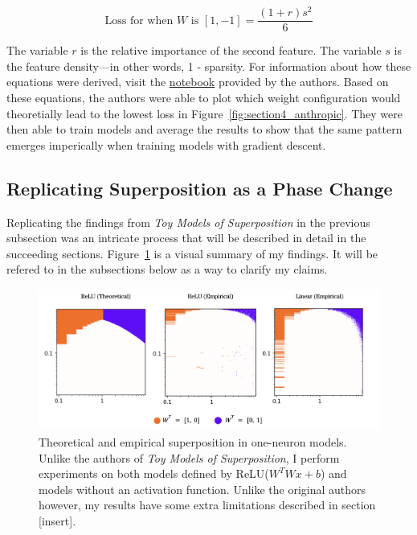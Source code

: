 \documentclass{article} %
\begin{document}
\begin{equation}
    \label{eq:loss3}
    \text{Loss for when  $W$ is $[1, -1]$} = \frac{(1 + r)s^2}{6}
\end{equation}

The variable $r$ is the relative importance of the second feature. The variable
$s$ is the feature density---in other words, 1 - sparsity. For information
about how these equations were derived, visit the
\href{https://github.com/wattenberg/superposition/blob/main/Exploring_Exact_Toy_Models.ipynb}{notebook} 
provided by the authors.
Based on these equations, the authors were able to plot which weight configuration
would theoretially lead to the lowest loss in Figure~\ref{fig:section4_anthropic}.
They were then able to train models and average the results to show that the
same pattern emerges imperically when training models with gradient descent.

\subsection{Replicating Superposition as a Phase Change}

Replicating the findings from \textit{Toy Models of Superposition} in the
previous subsection was an intricate process that will be described in detail in the
succeeding sections. Figure~\ref{fig:phase_changes_replication} is a visual
summary of my findings. It will be refered to in the subsections below as a
way to clarify my claims.

\begin{figure}[h]
    \centering
    \includegraphics[width=0.99\linewidth]{phase_changes/images/phase_changes_replication.png}
    \captionsetup{font=footnotesize, width=0.7\linewidth} %
    \caption{
        Theoretical and empirical superposition in one-neuron models. Unlike
        the authors of \textit{Toy Models of Superposition}, I perform experiments
        on both models defined by ReLU($W^TWx + b$) and models without an activation
        function. Unlike the original authors however, my results have some extra
        limitations described in section [insert].
    }
    \label{fig:phase_changes_replication}
\end{figure}
\end{document}
